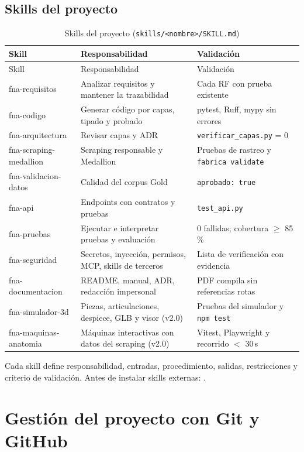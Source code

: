 \section{Skills del proyecto}
\begin{longtable}{@{}P{3.4cm}P{5.4cm}P{6.3cm}@{}}
\caption{Skills del proyecto (\texttt{skills/\textless nombre\textgreater/SKILL.md})}\label{tab:skills}\\\toprule
Skill & Responsabilidad & Validación\\\midrule\endfirsthead
\toprule Skill & Responsabilidad & Validación\\\midrule\endhead
fna-requisitos & Analizar requisitos y mantener la trazabilidad & Cada RF con prueba existente\\
fna-codigo & Generar código por capas, tipado y probado & pytest, Ruff, mypy sin errores\\
fna-arquitectura & Revisar capas y ADR & \texttt{verificar\_capas.py} = 0\\
fna-scraping-medallion & Scraping responsable y Medallion & Pruebas de rastreo y \texttt{fabrica validate}\\
fna-validacion-datos & Calidad del corpus Gold & \texttt{aprobado: true}\\
fna-api & Endpoints con contratos y pruebas & \texttt{test\_api.py}\\
fna-pruebas & Ejecutar e interpretar pruebas y evaluación & 0 fallidas; cobertura $\geq$ 85\,\%\\
fna-seguridad & Secretos, inyección, permisos, MCP, skills de terceros & Lista de verificación con evidencia\\
fna-documentacion & README, manual, ADR, redacción impersonal & PDF compila sin referencias rotas\\
fna-simulador-3d & Piezas, articulaciones, despiece, GLB y visor (v2.0) & Pruebas del simulador y \texttt{npm test}\\
fna-maquinas-anatomia & Máquinas interactivas con datos del scraping (v2.0) & Vitest, Playwright y recorrido $<$ 30\,s\\\bottomrule
\end{longtable}
Cada skill define responsabilidad, entradas, procedimiento, salidas, restricciones y criterio de validación.
Antes de instalar skills externas: .

\chapter{Gestión del proyecto con Git y GitHub}\label{cap:git}
